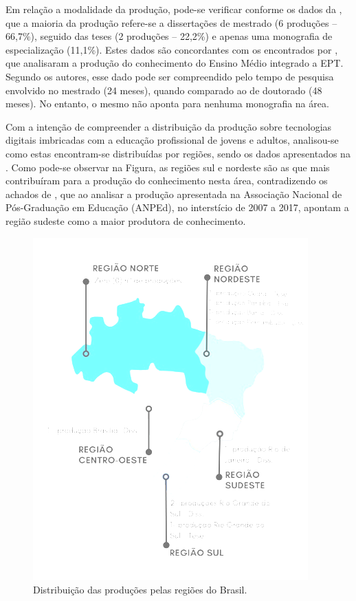 Em relação a modalidade da produção, pode-se verificar conforme os dados
da , que a maioria da produção refere-se a dissertações de
mestrado (6 produções -- 66,7\%), seguido das teses (2 produções --
22,2\%) e apenas uma monografia de especialização (11,1\%). Estes dados
são concordantes com os encontrados por \textcite{minuzzi2020}, que
analisaram a produção do conhecimento do Ensino Médio integrado a EPT.
Segundo os autores, esse dado pode ser compreendido pelo tempo de
pesquisa envolvido no mestrado (24 meses), quando comparado ao de
doutorado (48 meses). No entanto, o mesmo não aponta para nenhuma
monografia na área.

Com a intenção de compreender a distribuição da produção sobre
tecnologias digitais imbricadas com a educação profissional de jovens e
adultos, analisou-se como estas encontram-se distribuídas por regiões,
sendo os dados apresentados na . Como pode-se observar na
Figura, as regiões sul e nordeste são as que mais contribuíram para a
produção do conhecimento nesta área, contradizendo os achados de \textcite{barros_producao_2019}, que ao analisar a produção apresentada na Associação Nacional de Pós-Graduação em Educação (ANPEd), no interstício de 2007 a 2017, apontam a região sudeste como a maior produtora de conhecimento.

\begin{figure}[!htpb]
\centering
\begin{minipage}{.5\textwidth} 
\caption{Distribuição das produções pelas regiões do Brasil.}\label{fig3}
\includegraphics[width=\textwidth]{Fig3.png}
\end{minipage}
\end{figure}

